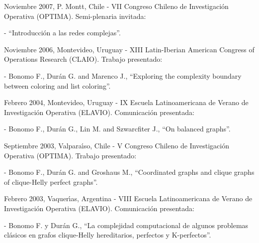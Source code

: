 \begin{compactitem}
\item Noviembre 2007, P. Montt, Chile - VII Congreso Chileno de
Investigaci\'on Ope\-ra\-ti\-va (OPTIMA). Semi-plenaria invitada:
\begin{compactitem}
\item[-] ``Introducci\'on a las redes complejas''.
\end{compactitem}

\smallskip

\item Noviembre 2006, Montevideo, Uruguay - XIII Latin-Iberian
American Congress of Operations Research (CLAIO). Trabajo
presentado:
\begin{compactitem}
\item[-] Bonomo F., Dur\'an G. and Marenco J., ``Exploring the
complexity boundary between coloring and list coloring''.
\end{compactitem}

\smallskip

\item Febrero 2004, Montevideo, Uruguay - IX Escuela
Latinoamericana de Verano de Investigaci\'on Operativa (ELAVIO).
Comunicaci\'on presentada:
\begin{compactitem}
\item[-] Bonomo F., Dur\'an G., Lin M. and Szwarcfiter J., ``On
balanced graphs''.
\end{compactitem}

\smallskip

\item Septiembre 2003, Valpara\'{\i}so, Chile - V Congreso Chileno
de Investigaci\'on Ope\-ra\-ti\-va (OPTIMA). Trabajo presentado:
\begin{compactitem}
\item[-] Bonomo F., Dur\'an G. and Groshaus M., ``Coordinated
graphs and clique graphs of clique-Helly perfect graphs''.
\end{compactitem}

\smallskip

\item Febrero 2003, Vaquer\'{\i}as, Argentina - VIII Escuela
Latinoamericana de Verano de Investigaci\'on Operativa (ELAVIO).
Comunicaci\'on presentada:
\begin{compactitem}
\item[-] Bonomo F. y Dur\'an G., ``La complejidad computacional de
algunos proble\-mas cl\'asicos en grafos clique-Helly
hereditarios, perfectos y K-perfectos''.
\end{compactitem}


\end{compactitem}
